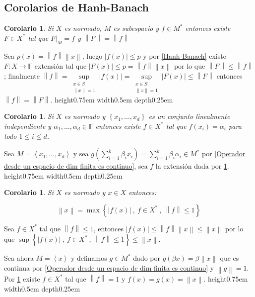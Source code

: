 \documentclass[11pt]{article}
\newcommand{\norm}[1]{\left\lVert#1\right\rVert}
\newcommand{\abs}[1]{\left\lvert#1\right\rvert}
\newcommand{\ip}[1]{\left\langle#1\right\rangle}
\newcommand{\sett}[1]{\left\lbrace#1\right\rbrace}
\numberwithin{theorem}{subsection}
\newtheorem{corollary}[theorem]{Corolario}
\newenvironment{proof}[1][Demostraci\'on]{\begin{trivlist}
		\item[\hskip \labelsep {\bfseries #1}]}{\end{trivlist}}
\newcommand{\qed}{\nobreak \ifvmode \relax \else
	\ifdim\lastskip<1.5em \hskip-\lastskip
	\hskip1.5em plus0em minus0.5em \fi \nobreak
	\vrule height0.75em width0.5em depth0.25em\fi}
\begin{document}
\subsection{Corolarios de Hanh-Banach}

\begin{corollary}
	\label{La extension del funcional preserva norma}
	Si $X$ es normado, $M$ es subespacio y $f \in M^{\ast}$ entonces existe $F \in X^{\ast}$ tal que $F \vert_{M} = f$ y $\norm{F} = \norm{f}$
\end{corollary}

\begin{proof}
	Sea $p(x) = \norm{f}\norm{x}$, luego $\abs{f(x)}\leq p$ y por \ref{Hanh-Banach} existe $F: X \rightarrow \mathbb{F}$ extensi\'on tal que $\abs{F(x)} \leq p = \norm{f} \norm{x}$  por lo que $\norm{F} \leq \norm{f}$; finalmente $\norm{f} = \sup\limits_{\substack{x \in S \\ \norm{x} = 1}} \abs{f(x)} = \sup\limits_{\substack{x \in S \\ \norm{x} = 1}} \abs{F(x)} \leq \norm{F}$ entonces $\norm{f} = \norm{F}$. \qed
\end{proof}

\begin{corollary}
	Si $X$ es normado y $\sett{x_1, \dots , x_d}$ es un conjunto linealmente independiente y $\alpha_1 , \dots , \alpha_d \in \mathbb{F}$ entonces existe $f \in X^{\ast}$ tal que $f(x_i) = \alpha_i$ para todo $1 \leq i \leq d$.
\end{corollary}

\begin{proof}
	Sea $M = \ip{x_1 , \dots , x_d}$ y sea $g( \sum\limits_{i=1}^{k}{\beta_i x_i}) = \sum\limits_{i=1}^{k}{\beta_i \alpha_i}  \in M^{\ast}$ por \ref{Operador desde un espacio de dim finita es continuo}, sea $f$ la extensi\'on dada por \ref{La extension del funcional preserva norma}. \qed
\end{proof}


\begin{corollary}
	\label{Norma en funcion de funcionales}
	Si $X$ es normado y $x \in X$ entonces:
	
	\begin{equation}
		\label{eq: Norma en funcion de funcionales}
		\norm{x} = \max \sett{\abs{f(x)} \ , \ f \in X^{\ast} \ , \ \norm{f} \leq 1}
	\end{equation}
\end{corollary}

\begin{proof}
	Sea $f \in X^{\ast}$ tal que $\norm{f} \leq 1$, entonces $\abs{f(x)} \leq \norm{f}\norm{x} \leq \norm{x}$ por lo que $\sup \sett{\abs{f(x)} \ , \ f \in X^{\ast} \ , \ \norm{f} \leq 1} \leq \norm{x}$.
	
	Sea ahora $M = \ip{x}$ y definamos $g \in M^{\ast}$ dado por $g(\beta x) = \beta \norm{x}$ que es continua por \ref{Operador desde un espacio de dim finita es continuo} y $\norm{g} = 1$. Por \ref{La extension del funcional preserva norma} existe $f \in X^{\ast}$ tal que $\norm{f}=1$ y $f(x) = g(x) = \norm{x}$. \qed
\end{proof}
\end{document}
